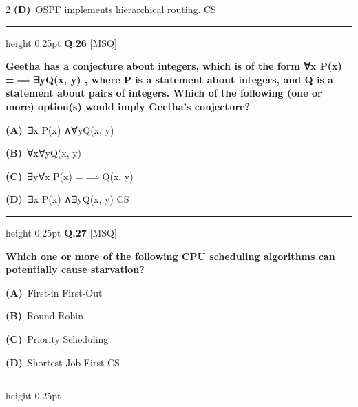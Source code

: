 \documentclass[a4paper,10pt,twoside]{article}
\begin{document}
\begin{multicols}{2}
\textbf{(D)}~OSPF implements hierarchical routing. \newline CS
\par\vspace{6pt}\hrule height 0.25pt\vspace{6pt}
\noindent\textbf{Q.26} \hfill {\footnotesize\textsf{[MSQ]}}
\par\vspace{2pt}
{\bfseries Geetha has a conjecture about integers, which is of the form
∀x
P(x) =$\implies$∃yQ(x, y)
,
where P is a statement about integers, and Q is a statement about pairs of integers.
Which of the following (one or more) option(s) would imply Geetha's conjecture? \par}
\par\vspace{2pt}\noindent
\textbf{(A)}~∃x \newline P(x) ∧∀yQ(x, y)\par\vspace{2pt}\noindent
\textbf{(B)}~∀x∀yQ(x, y)\par\vspace{2pt}\noindent
\textbf{(C)}~∃y∀x \newline P(x) =$\implies$Q(x, y)\par\vspace{2pt}\noindent
\textbf{(D)}~∃x \newline P(x) ∧∃yQ(x, y) \newline CS
\par\vspace{6pt}\hrule height 0.25pt\vspace{6pt}
\noindent\textbf{Q.27} \hfill {\footnotesize\textsf{[MSQ]}}
\par\vspace{2pt}
{\bfseries Which one or more of the following CPU scheduling algorithms can potentially
cause starvation? \par}
\par\vspace{2pt}\noindent
\textbf{(A)}~First-in First-Out\par\vspace{2pt}\noindent
\textbf{(B)}~Round Robin\par\vspace{2pt}\noindent
\textbf{(C)}~Priority Scheduling\par\vspace{2pt}\noindent
\textbf{(D)}~Shortest Job First \newline CS
\par\vspace{6pt}\hrule height 0.25pt\vspace{6pt}

\end{multicols}
\end{document}
